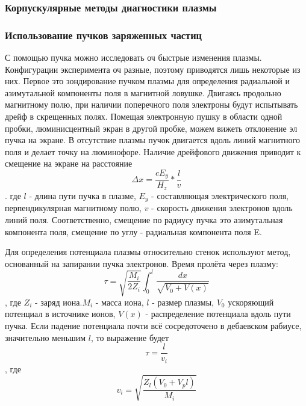 \documentclass[10pt, a4paper]{article}
\begin{document}
\subsubsection{Корпускулярные методы диагностики плазмы}

\subsubsection{Использование пучков заряженных частиц}

С помощью пучка можно исследовать оч быстрые изменения плазмы. Конфигурации эксперимента оч разные, поэтому приводятся лишь некоторые из них.
Первое это зондирование пучком плазмы для определения радиальной и азимутальной компоненты поля в магнитной ловушке. Двигаясь продольно магнитному полю, при наличии поперечного поля электроны будут испытывать дрейф в скрещенных полях. Помещая электронную пушку в области одной пробки, люминисцентный экран в другой пробке, можем вижеть отклонение эл пучка на экране.
В отсутствие плазмы пучок двигается вдоль линий магнитного поля и делает точку на люминофоре. Наличие дрейфового движения приводит к смещение на экране на расстояние
\begin{equation}
	\Delta x=\frac{cE_y}{H_z} * \frac{l}{v}
\end{equation}
. где $l$ - длина пути пучка в плазме, $E_y$ - составляющая электрического поля, перпендикулярная магнитному полю, $v$ - скорость движения электронов вдоль линий поля.
Соответственно, смещение по радиусу пучка это азимутальная компонента поля, смещение по углу - радиальная компонента поля E.

Для определения потенциала плазмы относительно стенок используют метод, основанный на запирании пучка электронов. Время пролёта через плазму:
\begin{equation}
	\tau = \sqrt{\frac{M_i}{2Z_i}} \int_{0}^{l} \frac{dx}{\sqrt{V_0 +V(x)}}
\end{equation}
, где $Z_i$ - заряд иона.$M_i$ - масса иона, $l$ - размер плазмы, $V_0$ ускоряющий потенциал в источнике ионов, $V(x)$ - распределение потенциала вдоль пути пучка.
Если падение потенциала почти всё сосредоточено в дебаевском рабиусе, значительно меньшим $l$, то выражение будет
\begin{equation}
	\tau = \frac{l}{v_i}
\end{equation}
, где 
\begin{equation}
   v_i= \sqrt{\frac{Z_l (V_0 + V_pl)}{M_i}}
\end{equation}
\end{document}
